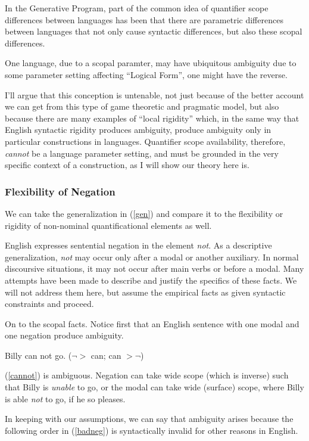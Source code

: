\documentclass{article}
\begin{document}
In the Generative Program, part of the common idea of quantifier scope differences between languages has been that there are parametric differences between languages that not only cause syntactic differences, but also these scopal differences.

One language, due to a scopal paramter, may have ubiquitous ambiguity due to some parameter setting affecting ``Logical Form'', one might have the reverse.

I'll argue that this conception is untenable, not just because of the better account we can get from this type of game theoretic and pragmatic model, but also because there are many examples of ``local rigidity'' which, in the same way that English syntactic rigidity produces ambiguity, produce ambiguity only in particular constructions in languages.
Quantifier scope availability, therefore, \emph{cannot} be a language parameter setting, and must be grounded in the very specific context of a construction, as I will show our theory here is.

\subsubsection{Flexibility of Negation}

We can take the generalization in (\ref{gen}) and compare it to the flexibility or rigidity of non-nominal quantificational elements as well.

English expresses sentential negation in the element \emph{not}. As a descriptive generalization, \emph{not} may occur only after a modal or another auxiliary. In normal discoursive situations, it may not occur after main verbs or before a modal. Many attempts have been made to describe and justify the specifics of these facts. We will not address them here, but assume the empirical facts as given syntactic constraints and proceed.

On to the scopal facts. Notice first that an English sentence with one modal and one negation produce ambiguity.

\begin{exe}
\ex Billy can not go. \label{cannot}\hfill ($\neg >$ can; can $> \neg$) 
\end{exe}

(\ref{cannot}) is ambiguous. Negation can take wide scope (which is inverse) such that Billy is \emph{unable} to go, or the modal can take wide (surface) scope, where Billy is able \emph{not} to go, if he so pleases.

In keeping with our assumptions, we can say that ambiguity arises because the following order in (\ref{badneg}) is syntactically invalid for other reasons in English.
\end{document}
